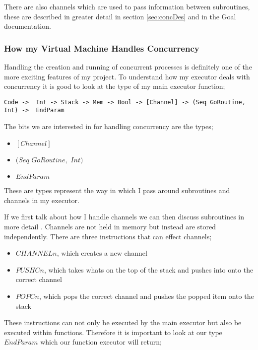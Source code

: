 There are also channels which are used to pass information between subroutines, these are described in greater detail in section \ref{sec:concDes} and in the Goal documentation.   

\subsubsection{How my Virtual Machine Handles Concurrency}

Handling the creation and running of concurrent processes is definitely one of the more exciting features of my project. To understand how my executor deals with concurrency it is good to look at the type of my main executor function;

\begin{lstlisting}[basicstyle=\ttfamily\tiny]
Code ->  Int -> Stack -> Mem -> Bool -> [Channel] -> (Seq GoRoutine, Int) ->  EndParam
\end{lstlisting}

The bits we are interested in for handling concurrency are the types;

\begin{itemize}
\item $[Channel]$
\item $(Seq$ $GoRoutine,$ $Int)$  %
\item $EndParam$
\end{itemize} 

These are types represent the way in which I pass around subroutines and channels in my executor. 

If we first talk about how I handle channels we can then discuss subroutines in more detail . Channels are not held in memory but instead are stored independently. There are three instructions that can effect channels;

\begin{itemize}
\item $CHANNEL n$, which creates a new channel
\item $PUSHC n$, which takes whats on the top of the stack and pushes into onto the correct channel 
\item $POPC n$, which pops the correct channel and pushes the popped item onto the stack
\end{itemize} 

These instructions can not only be executed by the main executor but also be executed within functions. Therefore it is important to look at our type $EndParam$ which our function executor will return;

